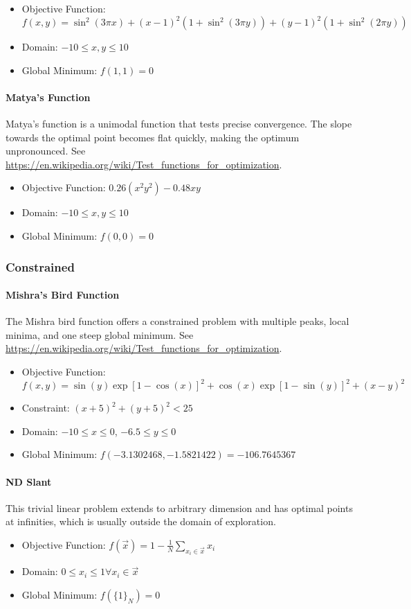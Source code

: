 \begin{itemize}
  \item Objective Function: $f(x, y) = \sin^2(3\pi x) + (x-1)^2(1 + \sin^2(3\pi y)) + (y-1)^2(1 + \sin^2(2\pi y))$
  \item Domain: $-10 \le x,y \le 10$
  \item Global Minimum: $f(1, 1)=0$
\end{itemize}

\paragraph{Matya's Function}
Matya's function is a unimodal function that tests precise convergence. The slope towards the optimal point becomes
flat quickly, making the optimum unpronounced.
See \url{https://en.wikipedia.org/wiki/Test_functions_for_optimization}.

\begin{itemize}
  \item Objective Function: $0.26(x^2 y^2) - 0.48xy$
  \item Domain: $-10 \le x,y \le 10$
  \item Global Minimum: $f(0, 0)=0$
\end{itemize}

\subsubsection{Constrained}
\paragraph{Mishra's Bird Function}
The Mishra bird function offers a constrained problem with multiple peaks, local minima, and one steep global
minimum.
See \url{https://en.wikipedia.org/wiki/Test_functions_for_optimization}.

\begin{itemize}
  \item Objective Function: $f(x,y) = \sin(y)\exp[1-\cos(x)]^2 + \cos(x)\exp[1-\sin(y)]^2 + (x-y)^2$
  \item Constraint: $(x+5)^2 + (y+5)^2 < 25$
  \item Domain: $-10 \leq x \leq 0$, $-6.5 \leq y \leq 0$
  \item Global Minimum: $f(-3.1302468, -1.5821422) = -106.7645367$
\end{itemize}

\paragraph{ND Slant}
This trivial linear problem extends to arbitrary dimension and has optimal points at infinities,
which is usually outside the domain of exploration.
\begin{itemize}
  \item Objective Function: $f(\vec x) = 1 - \frac{1}{N}\sum_{x_i\in \vec x} x_i$
  \item Domain: $0 \leq x_i \leq 1 \forall x_i \in \vec x$
  \item Global Minimum: $f(\{1\}_N) = 0$
\end{itemize}

